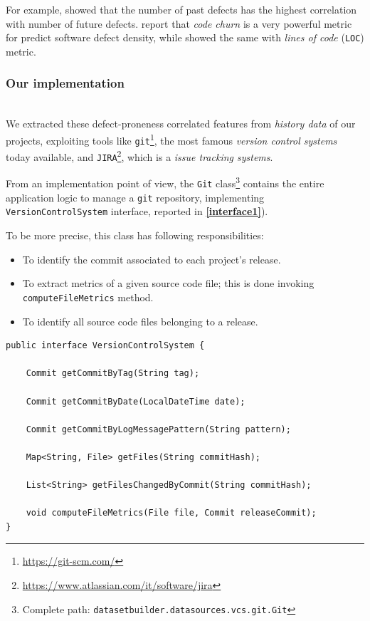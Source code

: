 \documentclass[sigconf]{acmart}
\begin{document}
For example, \citet{PredictingDefectsForEclipse} showed that the number of past defects has the highest correlation with number of future defects. \citet{Nagappan} report that \textit{code churn} is a very powerful metric for predict software defect density, while \citet{Gyimothy} showed the same with \textit{lines of code} (\texttt{LOC}) metric.

\subsubsection{Our implementation}
\hfill\\

We extracted these defect-proneness correlated features from \textit{history data} of our projects, exploiting tools like \texttt{git}\footnote{\url{https://git-scm.com/}}, the most famous \textit{version control systems} today available, and \texttt{JIRA}\footnote{\url{https://www.atlassian.com/it/software/jira}}, which is a \textit{issue tracking systems}.

From an implementation point of view, the \texttt{Git} class\footnote{Complete path: \texttt{datasetbuilder.datasources.vcs.git.Git}} contains the entire application logic to manage a \texttt{git} repository, implementing \texttt{Version\-Control\-System} interface, reported in \textbf{\cref{interface1}}). 

To be more precise, this class has following responsibilities: 
\begin{itemize}
\item To identify the commit associated to each project's release.
\item To extract metrics of a given source code file; this is done invoking \texttt{compute\-File\-Metrics} method.
\item To identify all source code files belonging to a release.
\end{itemize}

\begin{lstlisting}[frame=lines,basicstyle=\ttfamily\scriptsize, caption={\texttt{VersionControlSystem} interface}, label={interface1}]
public interface VersionControlSystem {

    Commit getCommitByTag(String tag);

    Commit getCommitByDate(LocalDateTime date);

    Commit getCommitByLogMessagePattern(String pattern);

    Map<String, File> getFiles(String commitHash);

    List<String> getFilesChangedByCommit(String commitHash);

    void computeFileMetrics(File file, Commit releaseCommit);
}
\end{lstlisting}
\end{document}
